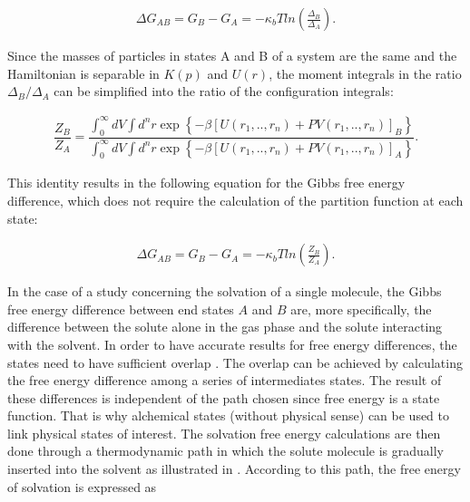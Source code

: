\begin{equation}
\begin{aligned}
\Delta G_{AB} = G_{B} - G_{A}= -\kappa_{b}T ln \left( \frac{\Delta_{B}}{\Delta_{A}}\right) .
\end{aligned}
\end{equation}

Since the masses of particles in states A and B of a system are the same and the Hamiltonian is separable in $K(p)$ and $U(r)$, the moment integrals in the ratio ${\Delta_{B}}/{\Delta_{A}}$ can be simplified into the ratio of the configuration integrals:

\begin{equation}
\label{eq:partiso}
\begin{aligned}
\dfrac{Z_{B}}{Z_{A}} = \dfrac{\int_{0}^{\infty} dV \int d^{n}r \exp \left\lbrace -\beta \left[U(r_{1},..,r_{n}) + PV(r_{1},..,r_{n}) \right]_{B} \right\rbrace}{\int_{0}^{\infty} dV \int d^{n}r \exp \left\lbrace  -\beta \left[U(r_{1},..,r_{n}) + PV(r_{1},..,r_{n}) \right]_{A} \right\rbrace }.
\end{aligned}
\end{equation}

This identity results in the following equation for the Gibbs free energy difference, which does not  require the calculation of the partition function at each state:

\begin{equation}
\label{eq:dif}
\begin{aligned}
\Delta G_{AB} = G_{B} - G_{A}= -\kappa_{b}T ln \left( \frac{Z_{B}}{Z_{A}}\right).
\end{aligned}
\end{equation}

In the case of a study concerning the solvation of a single molecule, the Gibbs free energy difference between end states $A$ and $B$ are, more specifically, the difference between the solute alone in the gas phase and the solute interacting with the solvent. In order to have accurate results for free energy differences, the states need to have sufficient overlap  \cite{klimovich}. The overlap can be achieved by calculating the free energy difference among a series of intermediates states. The result of these differences is independent of the path chosen since free energy is a state function. That is why alchemical states (without physical sense) can be used to link physical states of interest. The solvation free energy calculations are then done through a thermodynamic path in which the solute molecule is gradually inserted into the solvent as illustrated in . According to this path, the free energy of solvation is expressed as

